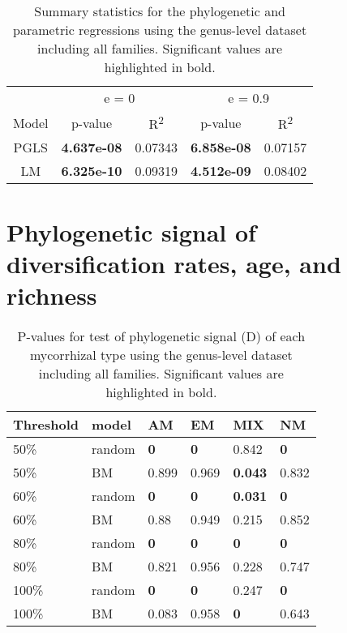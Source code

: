 \documentclass[]{article}
\begin{document}
\begin{table}[H]

\caption{\label{tab:unnamed-chunk-35}Summary statistics for the phylogenetic and parametric regressions using the genus-level dataset including all families. Significant values are highlighted in bold.}
\centering
\begin{tabular}{c|c|c|c|c}
\hline
\multicolumn{1}{c|}{ } & \multicolumn{2}{c|}{e = 0} & \multicolumn{2}{c}{e = 0.9} \\
\cline{2-3} \cline{4-5}
Model & p-value & R\textsuperscript{2} & p-value & R\textsuperscript{2}\\
\hline
PGLS & \textbf{4.637e-08} & 0.07343 & \textbf{6.858e-08} & 0.07157\\
\hline
LM & \textbf{6.325e-10} & 0.09319 & \textbf{4.512e-09} & 0.08402\\
\hline
\end{tabular}
\end{table}

\hypertarget{phylogenetic-signal-of-diversification-rates-age-and-richness}{%
\section{Phylogenetic signal of diversification rates, age, and
richness}\label{phylogenetic-signal-of-diversification-rates-age-and-richness}}

\begin{table}[H]

\caption{\label{tab:unnamed-chunk-37}P-values for test of phylogenetic signal (D) of each mycorrhizal type using the genus-level dataset including all families. Significant values are highlighted in bold.}
\centering
\begin{tabular}{l|l|l|l|l|l}
\hline
Threshold & model & AM & EM & MIX & NM\\
\hline
50\% & random & \textbf{0} & \textbf{0} & 0.842 & \textbf{0}\\
\hline
50\% & BM & 0.899 & 0.969 & \textbf{0.043} & 0.832\\
\hline
60\% & random & \textbf{0} & \textbf{0} & \textbf{0.031} & \textbf{0}\\
\hline
60\% & BM & 0.88 & 0.949 & 0.215 & 0.852\\
\hline
80\% & random & \textbf{0} & \textbf{0} & \textbf{0} & \textbf{0}\\
\hline
80\% & BM & 0.821 & 0.956 & 0.228 & 0.747\\
\hline
100\% & random & \textbf{0} & \textbf{0} & 0.247 & \textbf{0}\\
\hline
100\% & BM & 0.083 & 0.958 & \textbf{0} & 0.643\\
\hline
\end{tabular}
\end{table}
\end{document}
